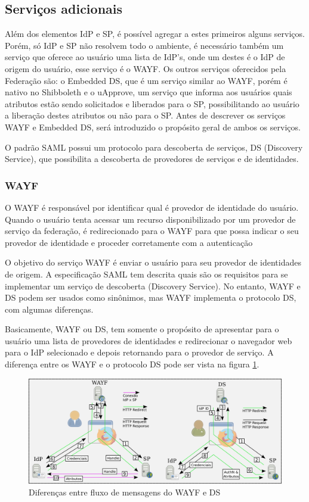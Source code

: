 \subsection{Serviços adicionais}
\label{ss_c4_servicos_add}

Além dos elementos IdP e SP, é possível agregar a estes primeiros alguns serviços. Porém, só IdP e SP não resolvem todo o ambiente, é necessário também um serviço que oferece ao usuário uma lista de IdP’s, onde um destes é o IdP de origem do usuário, esse serviço é o WAYF. Os outros serviços oferecidos pela Federação são: o Embedded DS, que é um serviço similar ao WAYF, porém é nativo no Shibboleth e o uApprove, um serviço que informa aos usuários quais atributos estão sendo solicitados e liberados para o SP, possibilitando ao usuário a liberação destes atributos ou não para o SP. Antes de descrever os serviços WAYF e Embedded DS, será introduzido o propósito geral de ambos os serviços.

O padrão SAML possui um protocolo para descoberta de serviços, DS (Discovery Service), que possibilita a descoberta de provedores de serviços e de identidades.

\subsubsection{WAYF}

O WAYF é responsável por identificar qual é provedor de identidade do usuário. Quando o usuário tenta acessar um recurso disponibilizado por um provedor de serviço da federação, é redirecionado para o WAYF para que possa indicar o seu provedor de identidade e proceder corretamente com a autenticação \cite{moreira:11}

O objetivo do serviço WAYF é enviar o usuário para seu provedor de identidades de origem. A especificação SAML tem descrita quais são os requisitos para se implementar um serviço de descoberta (Discovery Service). No entanto, WAYF e DS podem ser usados como sinônimos, mas WAYF implementa o protocolo DS, com algumas diferenças.

Basicamente, WAYF ou DS, tem somente o propósito de apresentar para o usuário uma lista de provedores de identidades e redirecionar o navegador web para o IdP selecionado e depois retornando para o provedor de serviço. A diferença entre os WAYF e o protocolo DS pode ser vista na figura \ref{fig_12}.

\begin{figure}[!htp]
 \centering
 \includegraphics[width=1\textwidth]{figuras/wayf-ds.png}
 \caption{Diferenças entre fluxo de mensagens do WAYF e DS}
 \label{fig_12}
\end{figure}

